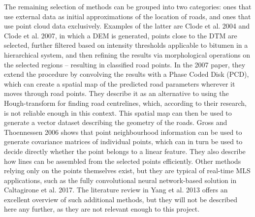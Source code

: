 The remaining selection of methods can be grouped into two categories: ones that use external data as initial approximations of the location of roads, and ones that use point cloud data exclusively.  Examples of the latter are Clode et al. 2004 and Clode et al. 2007, in which a DEM is generated, points close to the DTM are selected, further filtered based on intensity thresholds applicable to bitumen in a hierarchical system, and then refining the results via morphological operations on the selected regions – resulting in classified road points. In the 2007 paper, they extend the procedure by convolving the results with a Phase Coded Disk (PCD), which can create a spatial map of the predicted road parameters wherever it moves through road points. They describe it as an alternative to using the Hough-transform for finding road centrelines, which, according to their research, is not reliable enough in this context. This spatial map can then be used to generate a vector dataset describing the geometry of the roads. Gross and Thoennessen 2006 shows that point neighbourhood information can be used to generate covariance matrices of individual points, which can in turn be used to decide directly whether the point belongs to a linear feature. They also describe how lines can be assembled from the selected points efficiently. Other methods relying only on the points themselves exist, but they are typical of real-time MLS applications, such as the fully convolutional neural network-based solution in Caltagirone et al. 2017. The literature review in Yang et al. 2013 offers an excellent overview of such additional methods, but they will not be described here any further, as they are not relevant enough to this project.

